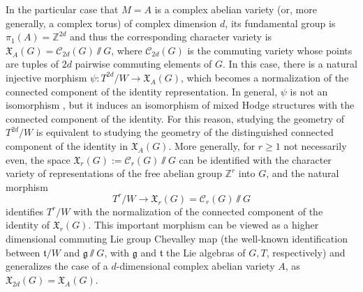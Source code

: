\documentclass[11pt,english]{amsart}
\numberwithin{equation}{section}
\numberwithin{figure}{section}
\theoremstyle{plain}
\theoremstyle{plain}
\theoremstyle{definition}
\theoremstyle{remark}
\newcommand{\ZZ}{\mathbb{Z}}
\begin{document}
In the particular case that $M = A$ is a complex abelian variety (or, more generally, a complex torus) of complex dimension $d$, its fundamental group is $\pi_1(A) = \ZZ^{2d}$ and thus the corresponding character variety is $\mathfrak{X}_A(G) = \mathcal{C}_{2d}(G) \sslash G$, where $\mathcal{C}_{2d}(G)$ is the commuting variety whose points are tuples of $2d$ pairwise commuting elements of $G$. In this case, there is a natural injective morphism $\psi: T^{2d}/W \to \mathfrak{X}_A(G)$,
which becomes a normalization of the connected component of the identity representation. In general, $\psi$ is not an isomorphism \cite{florentino2021singular,BFN}, but it induces an isomorphism of mixed Hodge structures \cite{florentino2024mixed} with the connected component of the identity. For this reason, studying the geometry of $T^{2d}/W$ is equivalent to studying the geometry of the distinguished connected component of the identity in $\mathfrak{X}_A(G)$. More generally, for $r \geq 1$ not necessarily even, the space $\mathfrak{X}_r(G):=\mathcal{C}_{r}(G) \sslash G$ can be identified with the character variety of representations of the free abelian group $\ZZ^r$ into $G$, and the natural morphism 
\[T^r/W \to \mathfrak{X}_r(G) = \mathcal{C}_{r}(G) \sslash G\]
identifies $T^r/W$ with the normalization of the connected component of the identity of $\mathfrak{X}_r(G)$.
This important morphism can be viewed as a higher dimensional commuting Lie group Chevalley map (the well-known identification between $\mathfrak t/W$ and $\mathfrak g \sslash G$, with $\mathfrak g$ and $\mathfrak t$ the Lie algebras of $G,T$,  respectively) and generalizes the case of a $d$-dimensional complex abelian variety $A$, as $\mathfrak{X}_{2d}(G) = \mathfrak{X}_A(G)$.
\end{document}
